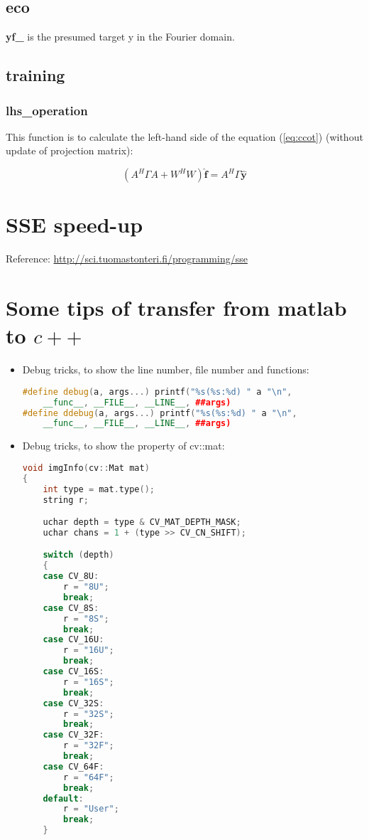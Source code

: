 \documentclass[12pt]{article}
\numberwithin{equation}{section}
\begin{document}
{\subsection{eco}
\textbf{yf\_} is the presumed target y in the Fourier domain. 
\subsection{training}
\subsubsection{lhs\_operation}
This function is to calculate the left-hand side of the equation (\ref{eq:ccot}) (without update of projection matrix): \par
\begin{equation} 
	(A^H \Gamma A + W^H W) \hat{\bm{f}} = A^H \Gamma \hat{\bm{y}}
\end{equation} \par

\section{SSE speed-up}
Reference: \url{http://sci.tuomastonteri.fi/programming/sse} \par
\section{Some tips of transfer from matlab to $c++$}
\begin{itemize}
	\item Debug tricks, to show the line number, file number and functions:
		\begin{lstlisting}[language=C++]
#define debug(a, args...) printf("%s(%s:%d) " a "\n", 
	__func__, __FILE__, __LINE__, ##args)
#define ddebug(a, args...) printf("%s(%s:%d) " a "\n", 
	__func__, __FILE__, __LINE__, ##args)
		\end{lstlisting}
	\item Debug tricks, to show the property of cv::mat:
		\begin{lstlisting}[language=C++]
void imgInfo(cv::Mat mat)
{
	int type = mat.type();
	string r;

	uchar depth = type & CV_MAT_DEPTH_MASK;
	uchar chans = 1 + (type >> CV_CN_SHIFT);

	switch (depth)
	{
	case CV_8U:
		r = "8U";
		break;
	case CV_8S:
		r = "8S";
		break;
	case CV_16U:
		r = "16U";
		break;
	case CV_16S:
		r = "16S";
		break;
	case CV_32S:
		r = "32S";
		break;
	case CV_32F:
		r = "32F";
		break;
	case CV_64F:
		r = "64F";
		break;
	default:
		r = "User";
		break;
	}


\end{lstlisting}
\end{itemize}}
\end{document}
